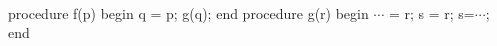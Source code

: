 {\tt
\begin{program}{0}
   procedure f(p) 
   begin
    q = p;
    g(q);
    end
   procedure g(r)
    begin
    $\cdots$ = r;
    s = r;
    s=$\cdots$;
    end
 \end{program}
 
}